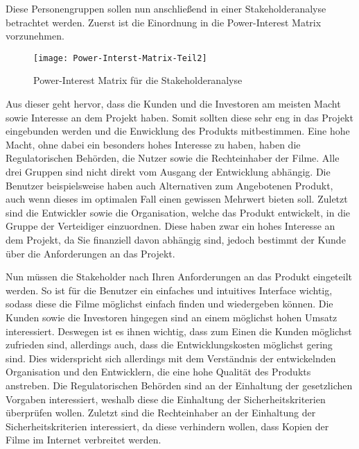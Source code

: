 Diese Personengruppen sollen nun anschließend in einer Stakeholderanalyse betrachtet werden.
Zuerst ist die Einordnung in die Power-Interest Matrix vorzunehmen.
\begin{figure}[ht]
    \centering
    \texttt{[image: Power-Interst-Matrix-Teil2]}
    \caption{Power-Interest Matrix für die Stakeholderanalyse}
    \label{fig:power-interest-matrix2}
\end{figure}

Aus dieser geht hervor, dass die Kunden und die Investoren am meisten Macht sowie Interesse an dem Projekt haben.
Somit sollten diese sehr eng in das Projekt eingebunden werden und die Enwicklung des Produkts mitbestimmen.
Eine hohe Macht, ohne dabei ein besonders hohes Interesse zu haben, haben die Regulatorischen Behörden, die Nutzer sowie die Rechteinhaber der Filme.
Alle drei Gruppen sind nicht direkt vom Ausgang der Entwicklung abhängig.
Die Benutzer beispielsweise haben auch Alternativen zum Angebotenen Produkt, auch wenn dieses im optimalen Fall einen gewissen Mehrwert bieten soll.
Zuletzt sind die Entwickler sowie die Organisation, welche das Produkt entwickelt, in die Gruppe der Verteidiger einzuordnen.
Diese haben zwar ein hohes Interesse an dem Projekt, da Sie finanziell davon abhängig sind, jedoch bestimmt der Kunde über die Anforderungen an das Projekt.


Nun müssen die Stakeholder nach Ihren Anforderungen an das Produkt eingeteilt werden.
So ist für die Benutzer ein einfaches und intuitives Interface wichtig, sodass diese die Filme möglichst einfach finden und wiedergeben können.
Die Kunden sowie die Investoren hingegen sind an einem möglichst hohen Umsatz interessiert.
Deswegen ist es ihnen wichtig, dass zum Einen die Kunden möglichst zufrieden sind, allerdings auch, dass die Entwicklungskosten möglichst gering sind.
Dies widerspricht sich allerdings mit dem Verständnis der entwickelnden Organisation und den Entwicklern, die eine hohe Qualität des Produkts anstreben.
Die Regulatorischen Behörden sind an der Einhaltung der gesetzlichen Vorgaben interessiert, weshalb diese die Einhaltung der Sicherheitskriterien überprüfen wollen.
Zuletzt sind die Rechteinhaber an der Einhaltung der Sicherheitskriterien interessiert, da diese verhindern wollen, dass Kopien der Filme im Internet verbreitet werden.
